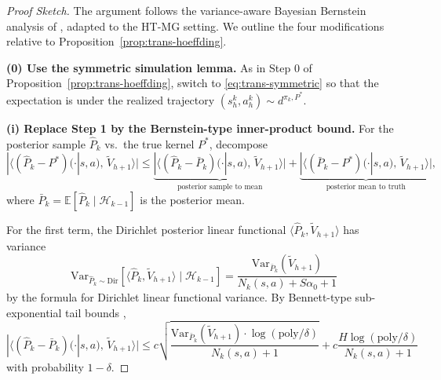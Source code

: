 \begin{proof}[Proof Sketch]
The argument follows the variance-aware Bayesian Bernstein analysis of \citet{lu2019information}, adapted to the HT-MG setting. We outline the four modifications relative to Proposition~\ref{prop:trans-hoeffding}.

\textbf{(0) Use the symmetric simulation lemma.} As in Step 0 of Proposition~\ref{prop:trans-hoeffding}, switch to \eqref{eq:trans-symmetric} so that the expectation is under the realized trajectory $(s_h^k, a_h^k) \sim d^{\pi_k, P^*}$.

\textbf{(i) Replace Step 1 by the Bernstein-type inner-product bound.} For the posterior sample $\hat{P}_k$ vs.\ the true kernel $P^*$, decompose
\begin{equation}
|\langle (\hat{P}_k - P^*)(\cdot|s,a),\, \widetilde{V}_{h+1}\rangle| \leq \underbrace{|\langle (\hat{P}_k - \bar{P}_k)(\cdot|s,a),\, \widetilde{V}_{h+1}\rangle|}_{\text{posterior sample to mean}} + \underbrace{|\langle (\bar{P}_k - P^*)(\cdot|s,a),\, \widetilde{V}_{h+1}\rangle|}_{\text{posterior mean to truth}},
\end{equation}
where $\bar{P}_k = \mathbb{E}[\hat{P}_k \mid \mathcal{H}_{k-1}]$ is the posterior mean.

For the first term, the Dirichlet posterior linear functional $\langle \hat{P}_k, \widetilde{V}_{h+1}\rangle$ has variance
\begin{equation}
\mathrm{Var}_{\hat{P}_k \sim \mathrm{Dir}}[\langle \hat{P}_k, \widetilde{V}_{h+1}\rangle \mid \mathcal{H}_{k-1}] = \frac{\mathrm{Var}_{\bar{P}_k}(\widetilde{V}_{h+1})}{N_k(s, a) + S\alpha_0 + 1}
\end{equation}
by the formula for Dirichlet linear functional variance. By Bennett-type sub-exponential tail bounds \citep[Theorem 3]{lu2019information},
\begin{equation}
\label{eq:bayes-bernstein-1}
|\langle (\hat{P}_k - \bar{P}_k)(\cdot|s,a),\, \widetilde{V}_{h+1}\rangle| \leq c\sqrt{\frac{\mathrm{Var}_{\bar{P}_k}(\widetilde{V}_{h+1}) \cdot \log(\mathrm{poly}/\delta)}{N_k(s, a) + 1}} + c\frac{H \log(\mathrm{poly}/\delta)}{N_k(s, a) + 1}
\end{equation}
with probability $1 - \delta$.


\end{proof}
